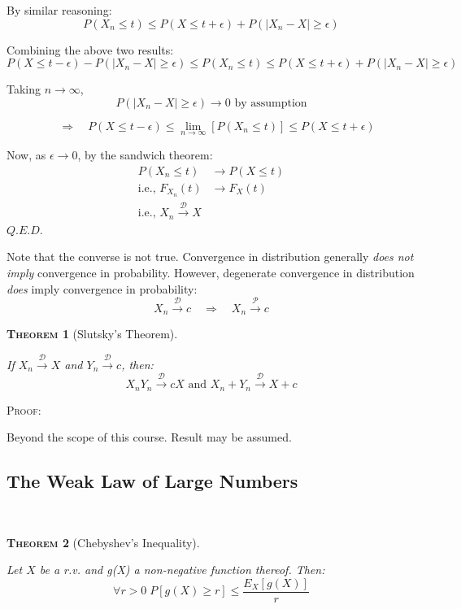 \documentclass[12pt,a4paper]{article}
\newtheorem{theorem}{\textsc{Theorem}}[section]
\newcommand{\imply}{\quad\Rightarrow\quad}
\begin{document}
By similar reasoning:
$$P(X_n\leq t) \leq P(X\leq t+\epsilon)+P(\left|X_n-X\right|\geq \epsilon)$$

Combining the above two results:
$$P(X\leq t-\epsilon) - P(\left|X_n-X\right|\geq \epsilon) \leq P(X_n\leq t) \leq P(X\leq t+\epsilon)+P(\left|X_n-X\right|\geq \epsilon)$$

Taking $n\to\infty$,
$$P(\left|X_n-X\right|\geq \epsilon)\to 0 \mbox{ by assumption}$$

$$\imply P(X\leq t-\epsilon) \leq \lim_{n\to\infty}\left[P(X_n\leq t)\right] \leq P(X\leq t+\epsilon)$$

Now, as $\epsilon\to 0$, by the sandwich theorem:
\begin{align*}
P(X_n\leq t) &\to P(X\leq t)\\
\text{i.e., } F_{X_n}(t) &\to F_X(t)\\
\text{i.e., } X_n \xrightarrow{\mathscr{D}} X
\end{align*}\hfill$Q.E.D.$\par\vspace{1cm}

Note that the converse is not true. Convergence in distribution generally \emph{does not imply} convergence in probability. However, degenerate convergence in distribution \emph{does} imply convergence in probability:
$$X_n\xrightarrow{\mathscr{D}} c \imply X_n \xrightarrow{\mathscr{P}} c$$

\begin{theorem}[Slutsky's Theorem]$\;$\par\vspace{1cm}

If $X_n\xrightarrow{\mathscr{D}} X$ and $Y_n\xrightarrow{\mathscr{D}}c$, then:
$$X_nY_n\xrightarrow{\mathscr{D}} cX \mbox{ and } X_n+Y_n\xrightarrow{\mathscr{D}} X+c$$

\end{theorem}

\noindent\textsc{Proof:}\par\vspace{1cm}

Beyond the scope of this course. Result may be assumed.\par\vspace{1cm}

\subsection{The Weak Law of Large Numbers}$\;$

\begin{theorem}[Chebyshev's Inequality]$\;$\par\vspace{1cm}

Let $X$ be a r.v. and g(X) a non-negative function thereof. Then:
$$\forall r>0\; P\left[g(X)\geq r\right] \leq \frac{E_X\left[g(X)\right]}{r}$$

\end{theorem}
\end{document}
